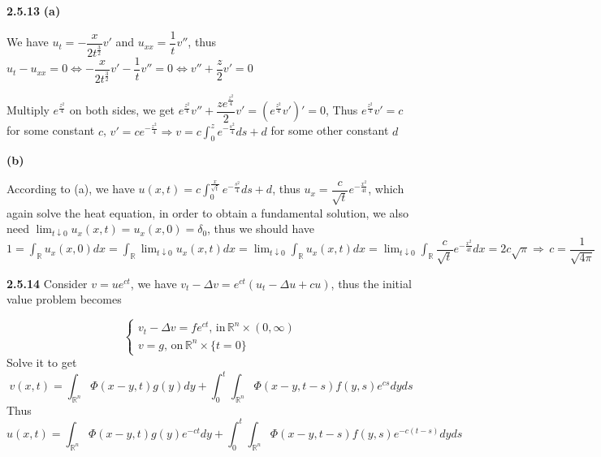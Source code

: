 \documentclass[../main.tex]{subfiles}
\begin{document}
\begin{customproblem}\textbf{2.5.13}
\textbf{(a)} \par
We have $u_{t}=-\dfrac{x}{2t^{\frac{3}{2}}}v'$ and $u_{xx}=\dfrac{1}{t}v''$, thus $u_{t}-u_{xx}=0 \Leftrightarrow -\dfrac{x}{2t^{\frac{3}{2}}}v'-\dfrac{1}{t}v''=0 \Leftrightarrow v''+\dfrac{z}{2}v'=0$ \par
Multiply $e^{\frac{z^{2}}{4}}$ on both sides, we get $e^{\frac{z^{2}}{4}}v''+\dfrac{ze^{\frac{z^{2}}{4}}}{2}v'=\left(e^{\frac{z^{2}}{4}}v'\right)'=0$, Thus $e^{\frac{z^{2}}{4}}v'=c$ for some constant $c$, $v'=ce^{-\frac{z^{2}}{4}} \Rightarrow \displaystyle v=c\int_{0}^{z}e^{-\frac{s^{2}}{4}}ds+d$ for some other constant $d$ \par
\textbf{(b)} \par
According to (a), we have $u(x,t)=\displaystyle c\int_{0}^{\frac{x}{\sqrt{t}}}e^{-\frac{s^{2}}{4}}ds+d$, thus $u_{x}=\dfrac{c}{\sqrt{t}}e^{-\frac{x^{2}}{4t}}$, which again solve the heat equation, in order to obtain a fundamental solution, we also need $\lim_{t\downarrow 0}u_x(x,t)=u_x(x,0)=\delta_0$, thus we should have $1=\displaystyle \int_\mathbb{R}u_x(x,0)dx=\int_\mathbb{R}\lim_{t\downarrow 0}u_x(x,t)dx=\lim_{t\downarrow 0}\int_\mathbb{R}u_x(x,t)dx=\lim_{t\downarrow 0}\int_\mathbb{R}\dfrac{c}{\sqrt{t}}e^{-\frac{x^{2}}{4t}}dx=2c\sqrt{\pi}\Rightarrow \, c=\dfrac{1}{\sqrt{4\pi}}$
\end{customproblem}

\begin{customproblem}\textbf{2.5.14}
Consider $v=ue^{ct}$, we have $v_{t}-\Delta v=e^{ct}\left(u_{t}-\Delta u+cu\right)$, thus the initial value problem becomes \par
\[
\left\{\begin{matrix}
v_{t}-\Delta v=fe^{ct},\,\text{in}\,\mathbb{R}^{n}\times(0,\infty)\\ 
v=g,\,\text{on}\,\mathbb{R}^{n}\times\{t=0\}
\end{matrix}\right.
\]
Solve it to get
\[
v(x,t)=\int_{\mathbb{R}^n}\Phi(x-y,t)g(y)dy + \int_0^t\int_{\mathbb{R}^n}\Phi(x-y,t-s)f(y,s)e^{cs}dyds
\]
Thus
\[
u(x,t)=\int_{\mathbb{R}^n}\Phi(x-y,t)g(y)e^{-ct}dy + \int_0^t\int_{\mathbb{R}^n}\Phi(x-y,t-s)f(y,s)e^{-c(t-s)}dyds
\]
\end{customproblem}
\end{document}

